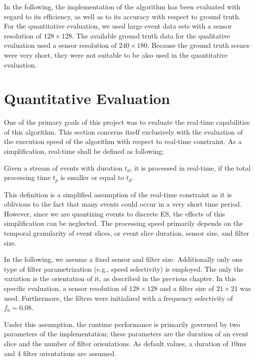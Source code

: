 In the following, the implementation of the algorithm has been evaluated with regard to its efficiency, as well as to its accuracy with respect to ground truth. 
For the quantitative evaluation, we used large event data sets with a sensor resolution of $128\times128$.
The available ground truth data for the qualitative evaluation used a sensor resolution of $240\times180$.
Because the ground truth scenes were very short, they were not suitable to be also used in the quantitative evaluation.

\section{Quantitative Evaluation}

One of the primary goals of this project was to evaluate the real-time capabilities of this algorithm.
This section concerns itself exclusively with the evaluation of the execution speed of the algorithm with respect to real-time constraint. As a simplification, real-time shall be defined as following;
\begin{defwrp}
	Given a stream of events with duration $t_d$, it is processed in real-time, if the total processing time $t_p$ is smaller or equal to $t_d$.
\end{defwrp}

This definition is a simplified assumption of the real-time constraint as it is oblivious to the fact that many events could occur in a very short time period.
However, since we are quantizing events to discrete ES, the effects of this simplification can be neglected.
The processing speed primarily depends on the temporal granularity of event slices, or event slice duration, sensor size, and filter size.

In the following, we assume a fixed sensor and filter size.
Additionally only one type of filter parametrization (e.g., speed selectivity) is employed.
The only the variation is the orientation of it, as described in the previous chapter.
In this specific evaluation, a sensor resolution of $128\times128$ and a filter size of $21\times21$ was used.
Furthermore, the filters were initialized with a frequency selectivity of $f_0=0.08$.

Under this assumption, the runtime performance is primarily governed by two parameters of the implementation; these parameters are the duration of an event slice and the number of filter orientations.
As default values, a duration of $10\mathrm{ms}$ and 4 filter orientations are assumed.

